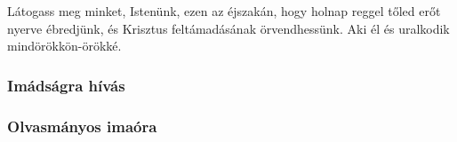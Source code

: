 \documentclass[twoside]{article}
\begin{document}
Látogass meg minket, Istenünk, ezen az éjszakán, hogy holnap reggel tőled erőt nyerve ébredjünk, és
Krisztus feltámadásának örvendhessünk. Aki él és uralkodik mindörökkön-örökké.

\subsubsection*{Imádságra hívás}


\subsubsection*{Olvasmányos imaóra}
\end{document}
